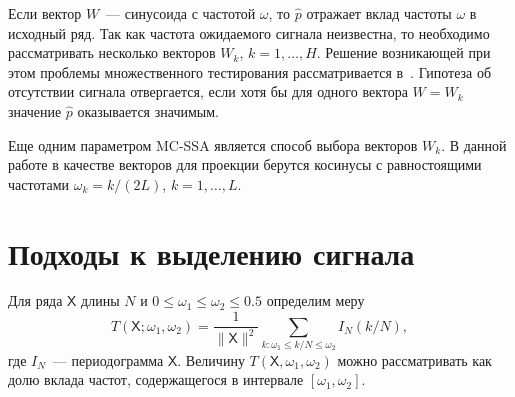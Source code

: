 \documentclass{math-mech-sci}
\begin{document}
Если вектор $W$~--- синусоида с частотой $\omega$, то $\widehat{p}$ отражает вклад частоты $\omega$ в исходный ряд. Так как частота ожидаемого сигнала неизвестна, то необходимо рассматривать несколько векторов $W_k$, $k=1,\ldots,H$. Решение возникающей при этом проблемы множественного тестирования рассматривается в~\cite{Golyandina2023}.
Гипотеза об отсутствии сигнала отвергается, если хотя бы для одного вектора $W=W_k$ значение $\widehat p$ оказывается значимым.

Еще одним параметром MC-SSA является способ выбора векторов $W_k$. В данной работе в качестве векторов для проекции берутся косинусы с равностоящими частотами $\omega_k=k/(2L)$, $k=1,\ldots,L$. 

\section*{Подходы к выделению сигнала}
Для ряда $\mathsf{X}$ длины $N$ и $0\leqslant\omega_1\leqslant\omega_2\leqslant0.5$ определим меру~\cite{ssaR}
$$
T(\mathsf{X};\omega_1,\omega_2)=\frac{1}{\|\mathsf{X}\|^2}\sum_{k:\omega_1\leqslant k/N\leqslant \omega_2}I_N(k/N),
$$
где $I_N$~--- периодограмма $\mathsf{X}$. Величину $T(\mathsf{X},\omega_1,\omega_2)$ можно рассматривать как долю вклада частот, содержащегося в интервале $[\omega_1,\omega_2]$. 
\end{document}
